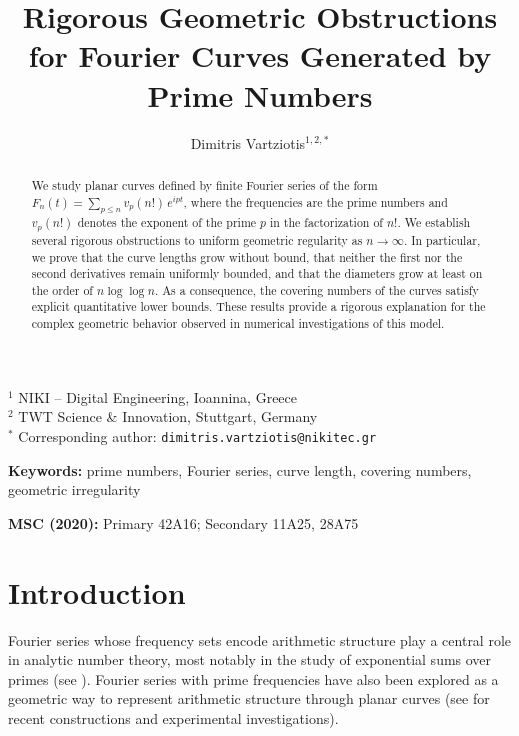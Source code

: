 \documentclass[11pt]{article}
\title{\textbf{Rigorous Geometric Obstructions for Fourier Curves Generated by Prime Numbers}}
\author{
Dimitris Vartziotis$^{1,2,*}$
}
\date{}
\theoremstyle{plain}
\begin{document}
\maketitle

\vspace{-1em}

\begin{center}
\footnotesize
$^{1}$ NIKI -- Digital Engineering, Ioannina, Greece\\
$^{2}$ TWT Science \& Innovation, Stuttgart, Germany\\
$^{*}$ Corresponding author: \texttt{dimitris.vartziotis@nikitec.gr}
\end{center}

\vspace{1em}

\begin{abstract}
We study planar curves defined by finite Fourier series of the form 
\( F_n(t)=\sum_{p\le n} v_p(n!)\, e^{i p t} \), 
where the frequencies are the prime numbers and \( v_p(n!) \) denotes the exponent of the prime \(p\) in the factorization of \(n!\). We establish several rigorous obstructions to uniform geometric regularity as \( n\to\infty \). In particular, we prove that the curve lengths grow without bound, that neither the first nor the second derivatives remain uniformly bounded, and that the diameters grow at least on the order of \( n\log\log n \). As a consequence, the covering numbers of the curves satisfy explicit quantitative lower bounds. These results provide a rigorous explanation for the complex geometric behavior observed in numerical investigations of this model.
\end{abstract}

\vspace{1em}

\noindent\textbf{Keywords:} prime numbers, Fourier series, curve length, covering numbers, geometric irregularity

\noindent\textbf{MSC (2020):} Primary 42A16; Secondary 11A25, 28A75

\section{Introduction}

Fourier series whose frequency sets encode arithmetic structure play a central role in analytic number theory, most notably in the study of exponential sums over primes (see \cite{HardyLittlewood1923,Montgomery1994}). Fourier series with prime frequencies have also been explored as a geometric way to represent arithmetic structure through planar curves (see \cite{Vartziotis2026a,Vartziotis2026b} for recent constructions and experimental investigations).
\end{document}
